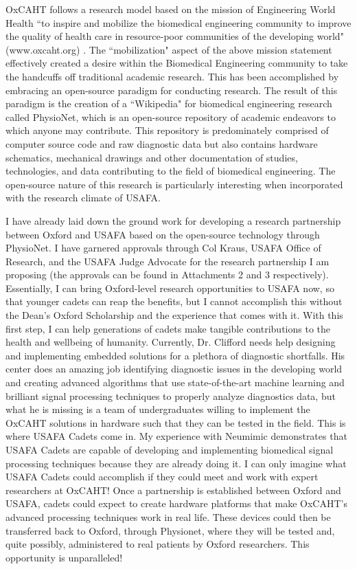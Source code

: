 \documentclass{article}
\begin{document}
OxCAHT follows a research model based on the mission of Engineering World
Health ``to inspire and mobilize the biomedical engineering community to improve
the quality of health care in resource-poor communities of the developing
world" (www.oxcaht.org) . The ``mobilization" aspect of the above mission
statement effectively created a desire within the Biomedical Engineering 
community to take the handcuffs off traditional academic research. This has
been accomplished by embracing an open-source paradigm for conducting research.
The result of this paradigm is the creation of a ``Wikipedia" for biomedical
engineering research called PhysioNet, which is an open-source repository of
academic endeavors to which anyone may contribute. This repository is
predominately comprised of computer source code and raw diagnostic data but
also contains hardware schematics, mechanical drawings and other documentation
of studies, technologies, and data contributing to the field of biomedical
engineering. The open-source nature of this research is particularly
interesting when incorporated with the research climate of USAFA.
 
I have already laid down the ground work for developing a research partnership between Oxford and USAFA based on the open-source
technology through PhysioNet. 
I have garnered approvals through Col Kraus, USAFA Office of Research, and the
USAFA Judge Advocate for the research partnership I am proposing (the
approvals can be found in Attachments 2 and 3
respectively). Essentially, I can bring Oxford-level research opportunities to USAFA
now, so that younger cadets can reap the benefits, but I cannot accomplish this without
the Dean's Oxford Scholarship and the experience that comes with it. With this first step,
I can help generations of cadets make tangible contributions to the health and wellbeing of humanity.
Currently, Dr. Clifford needs help designing and implementing embedded solutions
for a plethora of diagnostic shortfalls. His center does an amazing job
identifying diagnostic issues in the developing world and creating advanced algorithms that use
state-of-the-art machine learning and brilliant signal processing techniques to
properly analyze diagnostics data, but what he is missing is a team of
undergraduates willing to implement the OxCAHT solutions in hardware such that
they can be tested in the field. This is where USAFA Cadets come in. My experience with 
Neumimic demonstrates that USAFA Cadets are capable of developing and implementing biomedical 
signal processing techniques because they are already doing it. I can only
imagine what USAFA Cadets could accomplish if they could meet and work with
expert researchers at OxCAHT! Once a partnership is established between Oxford and USAFA,
cadets could expect to create hardware platforms that make OxCAHT's advanced processing techniques
work in real life. These devices could then be transferred back to Oxford, through Physionet,
where they will be tested and, quite possibly, administered to real patients by Oxford researchers.
This opportunity is unparalleled!
\end{document}
